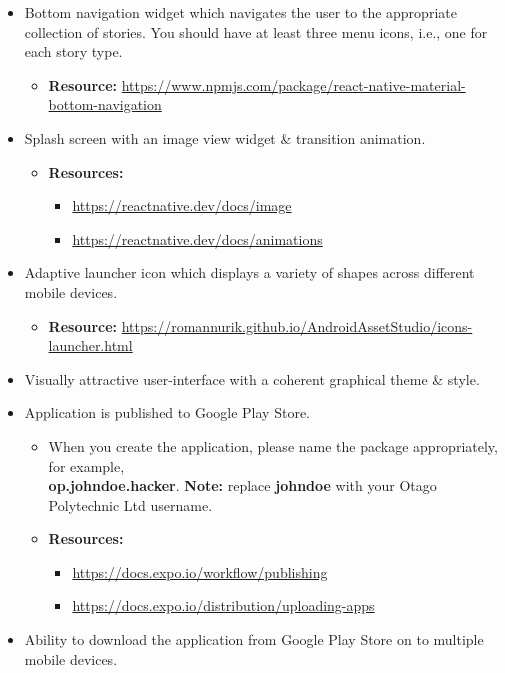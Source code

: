 \documentclass{article}
\begin{document}
\begin{itemize}
\begin{itemize}
    \end{itemize}
    \item Bottom navigation widget which navigates the user to the appropriate collection of stories. You should have at least three menu icons, i.e., one for each story type. 
    \begin{itemize}
        \item \textbf{Resource:} \footnotesize\href{https://www.npmjs.com/package/react-native-material-bottom-navigation}{https://www.npmjs.com/package/react-native-material-bottom-navigation}
    \end{itemize}
    \item Splash screen with an image view widget \& transition animation.
    \begin{itemize}
        \item \textbf{Resources:}
        \begin{itemize}
            \item \footnotesize\href{https://reactnative.dev/docs/image}{https://reactnative.dev/docs/image}
            \item \footnotesize\href{https://reactnative.dev/docs/animations}{https://reactnative.dev/docs/animations}
        \end{itemize}
    \end{itemize}
    \item Adaptive launcher icon which displays a variety of shapes across different mobile devices.
    \begin{itemize}
        \item \textbf{Resource:} \footnotesize\href{https://romannurik.github.io/AndroidAssetStudio/icons-launcher.html}{https://romannurik.github.io/AndroidAssetStudio/icons-launcher.html} 
    \end{itemize}
    \item Visually attractive user-interface with a coherent graphical theme \& style.
    \item Application is published to Google Play Store.
    \begin{itemize}
        \item When you create the application, please name the package appropriately, for example, \\ \textbf{op.johndoe.hacker}. \textbf{Note:} replace \textbf{johndoe} with your Otago Polytechnic Ltd username.
        \item \textbf{Resources:}
        \begin{itemize}
            \item \footnotesize\href{https://docs.expo.io/workflow/publishing}{https://docs.expo.io/workflow/publishing}
            \item \footnotesize\href{https://docs.expo.io/distribution/uploading-apps}{https://docs.expo.io/distribution/uploading-apps}
        \end{itemize}
    \end{itemize}
    \item Ability to download the application from Google Play Store on to multiple mobile devices.
\end{itemize}
\end{document}
